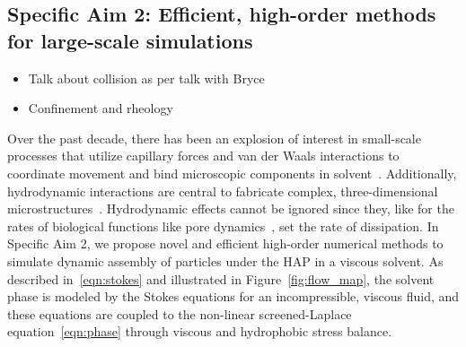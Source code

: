 \subsection{Specific Aim 2: Efficient, high-order methods for
large-scale simulations}
\label{sec:specificaim2}
\begin{itemize}
  \item Talk about collision as per talk with Bryce
  \item Confinement and rheology
\end{itemize}

Over the past decade, there has been an explosion of interest in
small-scale processes that utilize capillary forces and van der Waals
interactions to coordinate movement and bind microscopic components in
solvent~\cite{Pandey2011, Zhang2017, Siontorou2017}. Additionally,
hydrodynamic interactions are central to fabricate complex,
three-dimensional microstructures~\cite{Dasgupta2017, Leong2007,
Reynolds2019, Cho2010}. Hydrodynamic effects cannot be ignored since
they, like for the rates of biological functions like pore
dynamics~\cite{RYHAM20112929}, set the rate of dissipation. In Specific
Aim 2, we propose novel and efficient high-order numerical methods to
simulate dynamic assembly of particles under the HAP in a viscous
solvent. As described in~\eqref{eqn:stokes} and illustrated in
Figure~\ref{fig:flow_map}, the solvent phase is modeled by the Stokes
equations for an incompressible, viscous fluid, and these equations are
coupled to the non-linear screened-Laplace equation~\eqref{eqn:phase}
through viscous and hydrophobic stress balance. 
 
